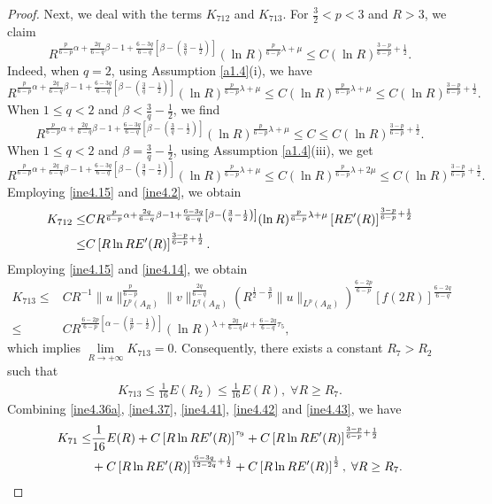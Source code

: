 \documentclass[10pt,a4paper]{amsart}
\begin{document}
\begin{proof}
Next, we deal with the terms $K_{712}$ and $K_{713}$. For $\frac{3}{2}<p<3$ and $R>3$, we claim
 $$
 R^{\frac{p}{6-p}\alpha+\frac{2q}{6-q}\beta-1+\frac{6-3q}{6-q}\left[\beta-\left(\frac{3}{q}-\frac{1}{2}\right)\right]}(\ln R)^{\frac{p}{6-p}\lambda+\mu}\leq C(\ln R)^{\frac{3-p}{6-p}+\frac{1}{2}}.
 $$
Indeed, when $q=2$, using Assumption \ref{a1.4}(i), we have
 $$
 R^{\frac{p}{6-p}\alpha+\frac{2q}{6-q}\beta-1+\frac{6-3q}{6-q}\left[\beta-\left(\frac{3}{q}-\frac{1}{2}\right)\right]}(\ln R)^{\frac{p}{6-p}\lambda+\mu}\leq C(\ln R)^{\frac{p}{6-p}\lambda+\mu}\leq C(\ln R)^{\frac{3-p}{6-p}+\frac{1}{2}}.
 $$
 When $1\leq q<2$ and $\beta<\frac{3}{q}-\frac{1}{2}$, we find
 $$
 R^{\frac{p}{6-p}\alpha+\frac{2q}{6-q}\beta-1+\frac{6-3q}{6-q}\left[\beta-\left(\frac{3}{q}-\frac{1}{2}\right)\right]}(\ln R)^{\frac{p}{6-p}\lambda+\mu}\leq C\leq C(\ln R)^{\frac{3-p}{6-p}+\frac{1}{2}}.
 $$
 When $1\leq q<2$ and $\beta=\frac{3}{q}-\frac{1}{2}$, using Assumption \ref{a1.4}(iii), we get
 $$
 R^{\frac{p}{6-p}\alpha+\frac{2q}{6-q}\beta-1+\frac{6-3q}{6-q}\left[\beta-\left(\frac{3}{q}-\frac{1}{2}\right)\right]}(\ln R)^{\frac{p}{6-p}\lambda+\mu}\leq C(\ln R)^{\frac{p}{6-p}\lambda+2\mu}\leq C(\ln R)^{\frac{3-p}{6-p}+\frac{1}{2}}.
 $$
Employing \eqref{ine4.15} and \eqref{ine4.2}, we obtain
\begin{align}\label{ine4.42}
	K_{712}\leq&C R^{\frac{p}{6-p}\alpha+\frac{2q}{6-q}\beta-1+\frac{6-3q}{6-q}\left[\beta-\left(\frac{3}{q}-\frac{1}{2}\right)\right]}(\ln R)^{\frac{p}{6-p}\lambda+\mu}\left[RE'(R)\right]^{\frac{3-p}{6-p}+\frac{1}{2}}\notag\\
  \leq&C\left[R\ln RE'(R)\right]^{\frac{3-p}{6-p}+\frac{1}{2}}.
\end{align}
Employing \eqref{ine4.15} and \eqref{ine4.14}, we obtain
\begin{align*}
K_{713} \leq&C R^{-1} \|u\|_{L^p(A_R)}^{\frac{p}{6-p}}\|v\|_{L^q(A_R)}^{\frac{2q}{6-q}}\left(R^{\frac{1}{2}-\frac{3}{p}} \|u\|_{L^p(A_R)}\right)^{\frac{6-2p}{6-p}}\left[f(2R)\right]^{\frac{6-2q}{6-q}}\\
\leq&CR^{\frac{6-2p}{6-p}\left[\alpha-\left(\frac{3}{p}-\frac{1}{2}\right)\right]}(\ln R)^{\lambda+\frac{2q}{6-q}\mu+\frac{6-2q}{6-q}\tau_5},
\end{align*}
which implies $\lim\limits_{R\rightarrow+\infty}K_{713}=0$.
Consequently, there exists a constant $R_7>R_2$ such that
\begin{align}\label{ine4.43}
K_{713}\leq\frac{1}{16}E(R_2)\leq \frac{1}{16}E(R),\;\forall R\geq R_7.
\end{align}
Combining \eqref{ine4.36a}, \eqref{ine4.37}, \eqref{ine4.41}, \eqref{ine4.42} and \eqref{ine4.43}, we have
\begin{align}\label{ine4.44}
K_{71}\leq&\frac{1}{16}E(R)+C\left[R\ln RE'(R)\right]^{\tau_9}+C\left[R\ln RE'(R)\right]^{\frac{3-p}{6-p}+\frac{1}{2}}\notag\\
&+C\left[R\ln RE'(R)\right]^{\frac{6-3q}{12-2q}+\frac{1}{2}}+C\left[R\ln R E'(R)\right]^{\frac{1}{2}},\;\forall R\geq R_7.
\end{align}




\end{proof}
\end{document}
